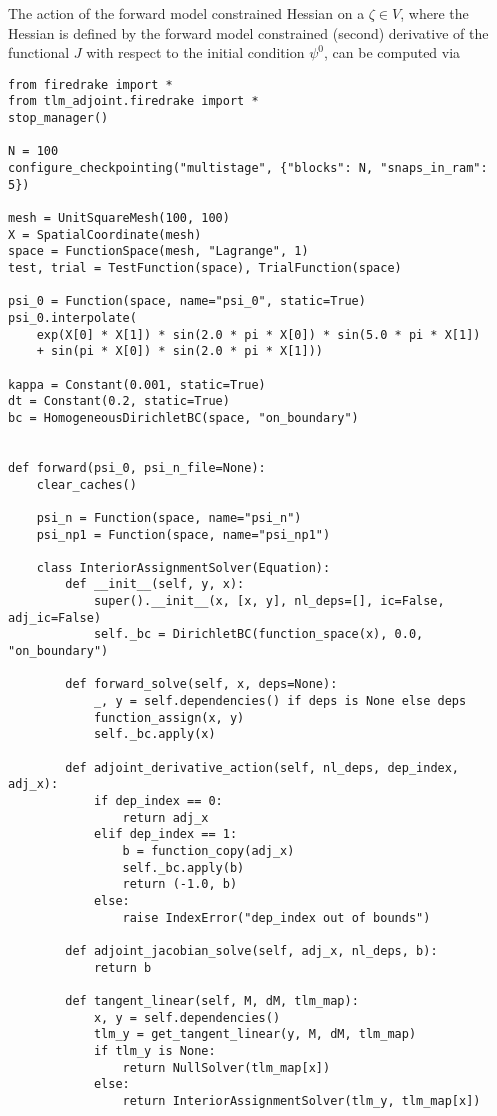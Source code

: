 \documentclass[11pt]{article}
\begin{document}
The action of the forward model constrained Hessian on a $\zeta \in V$, where
the Hessian is defined by the forward model constrained (second) derivative of
the functional $J$ with respect to the initial condition $\psi^0$, can be
computed via
\begin{lstlisting}
from firedrake import *
from tlm_adjoint.firedrake import *
stop_manager()

N = 100
configure_checkpointing("multistage", {"blocks": N, "snaps_in_ram": 5})

mesh = UnitSquareMesh(100, 100)
X = SpatialCoordinate(mesh)
space = FunctionSpace(mesh, "Lagrange", 1)
test, trial = TestFunction(space), TrialFunction(space)

psi_0 = Function(space, name="psi_0", static=True)
psi_0.interpolate(
    exp(X[0] * X[1]) * sin(2.0 * pi * X[0]) * sin(5.0 * pi * X[1])
    + sin(pi * X[0]) * sin(2.0 * pi * X[1]))

kappa = Constant(0.001, static=True)
dt = Constant(0.2, static=True)
bc = HomogeneousDirichletBC(space, "on_boundary")


def forward(psi_0, psi_n_file=None):
    clear_caches()

    psi_n = Function(space, name="psi_n")
    psi_np1 = Function(space, name="psi_np1")

    class InteriorAssignmentSolver(Equation):
        def __init__(self, y, x):
            super().__init__(x, [x, y], nl_deps=[], ic=False, adj_ic=False)
            self._bc = DirichletBC(function_space(x), 0.0, "on_boundary")

        def forward_solve(self, x, deps=None):
            _, y = self.dependencies() if deps is None else deps
            function_assign(x, y)
            self._bc.apply(x)

        def adjoint_derivative_action(self, nl_deps, dep_index, adj_x):
            if dep_index == 0:
                return adj_x
            elif dep_index == 1:
                b = function_copy(adj_x)
                self._bc.apply(b)
                return (-1.0, b)
            else:
                raise IndexError("dep_index out of bounds")

        def adjoint_jacobian_solve(self, adj_x, nl_deps, b):
            return b

        def tangent_linear(self, M, dM, tlm_map):
            x, y = self.dependencies()
            tlm_y = get_tangent_linear(y, M, dM, tlm_map)
            if tlm_y is None:
                return NullSolver(tlm_map[x])
            else:
                return InteriorAssignmentSolver(tlm_y, tlm_map[x])


\end{lstlisting}
\end{document}
